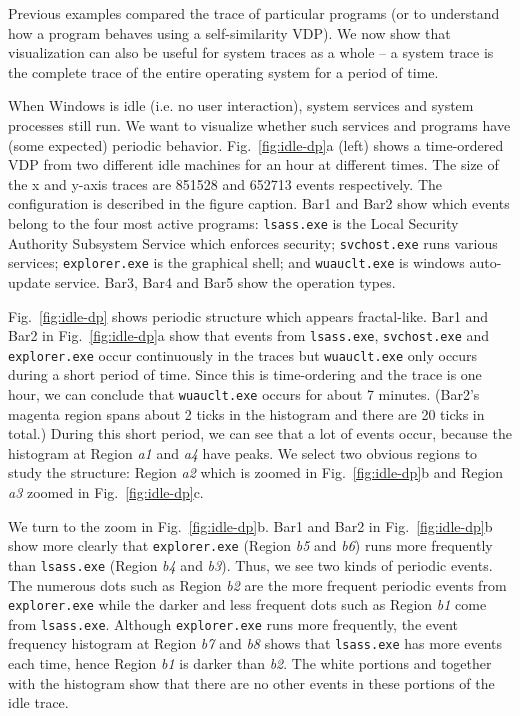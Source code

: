 Previous examples compared the trace of particular programs
(or to understand
how a program behaves using a self-similarity VDP).
We now show that visualization can also be useful for system traces
as a whole -- a system trace is the complete trace of the entire operating
system for a period of time.


When Windows is idle (i.e. no user interaction), 
system services and system processes still run.
We want to visualize whether such services and programs have 
(some expected) periodic behavior.
Fig.~\ref{fig:idle-dp}a (left) shows a time-ordered VDP from two 
different idle machines for an hour at different times.
The size of the x and y-axis traces are 
851528 and 652713 events respectively.
The configuration is described in the figure caption.
Bar1 and Bar2 show which events belong to
the four most active programs:
{\tt lsass.exe} is the Local Security Authority Subsystem Service which
enforces security;
{\tt svchost.exe} runs various services;
{\tt explorer.exe} is the graphical shell;
and {\tt wuauclt.exe} is windows auto-update service.
Bar3, Bar4 and Bar5 show the operation types.

Fig.~\ref{fig:idle-dp} shows periodic structure which appears
fractal-like.
Bar1 and Bar2 in Fig.~\ref{fig:idle-dp}a
show that events from {\tt lsass.exe}, {\tt svchost.exe} and {\tt explorer.exe}
occur continuously in the traces but {\tt wuauclt.exe} only occurs
during a short period of time.
Since this is time-ordering and the trace is one hour, we can conclude that
{\tt wuauclt.exe} occurs for about 7 minutes. (Bar2's magenta region
spans about 2
ticks in the histogram and there are 20 ticks in total.)
During this short period, we can see that a lot of events occur,
because the histogram at Region {\em a1} and {\em a4} have peaks.
We select two obvious regions to study the structure:
Region {\em a2} which is zoomed in Fig.~\ref{fig:idle-dp}b and 
Region {\em a3} zoomed in Fig.~\ref{fig:idle-dp}c.

We turn to the zoom in Fig.~\ref{fig:idle-dp}b.
Bar1 and Bar2 in
Fig.~\ref{fig:idle-dp}b show more clearly that
{\tt explorer.exe} (Region {\em b5} and {\em b6}) runs
more frequently than {\tt lsass.exe} (Region {\em b4} and {\em b3}).
Thus, we see two kinds of periodic events. The numerous dots such
as Region {\em b2} are the more frequent periodic events from 
{\tt explorer.exe} while the darker and less frequent dots such as
Region {\em b1} come from {\tt lsass.exe}.
Although {\tt explorer.exe} runs more frequently,
the event frequency histogram at Region {\em b7} and {\em b8} shows
that {\tt lsass.exe} has more events each time, hence Region {\em b1}
is darker than {\em b2}.
The white portions and together with the histogram show that there
are no other events in these portions of the idle trace.

